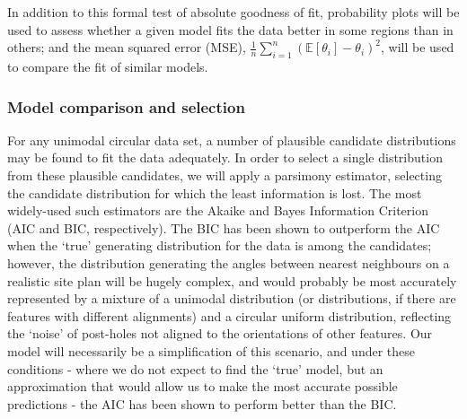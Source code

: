 \documentclass[../../ArchStats.tex]{subfiles}
\begin{document}
In addition to this formal test of absolute goodness of fit, probability plots will be used to assess whether a given model fits the data better in some regions than in others; and the mean squared error (MSE), $\frac{1}{n} \sum_{i=1}^n (\mathbb{E}\left[\theta_i\right] - \theta_i)^2$, will be used to compare the fit of similar models.

\subsubsection{Model comparison and selection}
\label{sec:AIC}

For any unimodal circular data set, a number of plausible candidate distributions may be found to fit the data adequately. In order to select a single distribution from these plausible candidates, we will apply a parsimony estimator, selecting the candidate distribution for which the least information is lost. The most widely-used such estimators are the Akaike and Bayes Information Criterion (AIC and BIC, respectively). The BIC has been shown to outperform the AIC when the `true' generating distribution for the data is among the candidates\cite{aho2014}; however, the distribution generating the angles between nearest neighbours on a realistic site plan will be hugely complex, and would probably be most accurately represented by a mixture of a unimodal distribution (or distributions, if there are features with different alignments) and a circular uniform distribution, reflecting the `noise'  of post-holes not aligned to the orientations of other features. Our model will necessarily be a simplification of this scenario, and under these conditions - where we do not expect to find the `true' model, but an approximation that would allow us to make the most accurate possible predictions - the AIC has been shown to perform better than the BIC.
\end{document}
